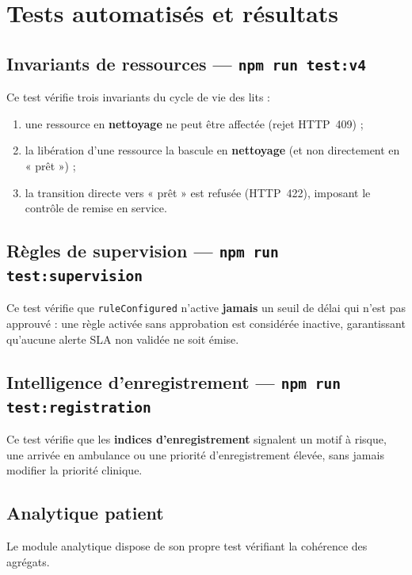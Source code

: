 \section{Tests automatisés et résultats}

\subsection{Invariants de ressources — \texttt{npm run test:v4}}

Ce test vérifie trois invariants du cycle de vie des lits :

\begin{enumerate}
    \item une ressource en \textbf{nettoyage} ne peut être affectée (rejet HTTP~409) ;
    \item la libération d'une ressource la bascule en \textbf{nettoyage} (et non directement en « prêt ») ;
    \item la transition directe vers « prêt » est refusée (HTTP~422), imposant le contrôle de remise en service.
\end{enumerate}

\subsection{Règles de supervision — \texttt{npm run test:supervision}}

Ce test vérifie que \texttt{ruleConfigured} n'active \textbf{jamais} un seuil de délai qui n'est pas approuvé : une règle activée sans approbation est considérée inactive, garantissant qu'aucune alerte SLA non validée ne soit émise.

\subsection{Intelligence d'enregistrement — \texttt{npm run test:registration}}

Ce test vérifie que les \textbf{indices d'enregistrement} signalent un motif à risque, une arrivée en ambulance ou une priorité d'enregistrement élevée, sans jamais modifier la priorité clinique.

\subsection{Analytique patient}

Le module analytique dispose de son propre test vérifiant la cohérence des agrégats.

